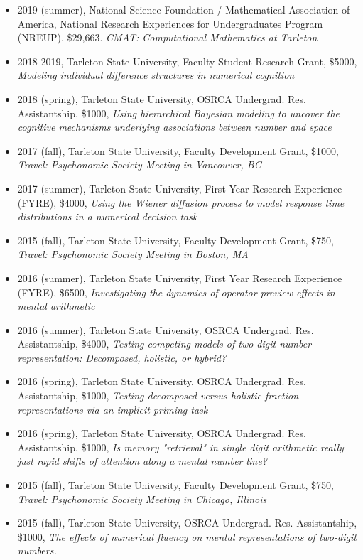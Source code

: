 \documentclass[article,10pt]{article}
\begin{document}
\begin{itemize}
\item 2019 (summer), National Science Foundation / Mathematical Association of America, National Research Experiences for Undergraduates Program (NREUP), \$29,663. \emph{CMAT: Computational Mathematics at Tarleton}
\item 2018-2019, Tarleton State University, Faculty-Student Research Grant, \$5000, \emph{Modeling individual difference structures in numerical cognition}
\item 2018 (spring), Tarleton State University, OSRCA Undergrad. Res. Assistantship, \$1000, \emph{Using hierarchical Bayesian modeling to uncover the cognitive mechanisms underlying associations between number and space}
\item 2017 (fall), Tarleton State University, Faculty Development Grant, \$1000, \emph{Travel: Psychonomic Society Meeting in Vancouver, BC}
\item 2017 (summer), Tarleton State University, First Year Research Experience (FYRE), \$4000, \emph{Using the Wiener diffusion process to model response time distributions in a numerical decision task}
\item 2015 (fall), Tarleton State University, Faculty Development Grant, \$750, \emph{Travel: Psychonomic Society Meeting in Boston, MA}
\item 2016 (summer), Tarleton State University, First Year Research Experience (FYRE), \$6500, \emph{Investigating the dynamics of operator preview effects in mental arithmetic}
\item 2016 (summer), Tarleton State University, OSRCA Undergrad. Res. Assistantship, \$4000, \emph{Testing competing models of two-digit number representation: Decomposed, holistic, or hybrid?}
\item 2016 (spring), Tarleton State University, OSRCA Undergrad. Res. Assistantship, \$1000, \emph{Testing decomposed versus holistic fraction representations via an implicit priming task}
\item 2016 (spring), Tarleton State University, OSRCA Undergrad. Res. Assistantship, \$1000, \emph{Is memory "retrieval" in single digit arithmetic really just rapid shifts of attention along a mental number line?}
\item 2015 (fall), Tarleton State University, Faculty Development Grant, \$750, \emph{Travel: Psychonomic Society Meeting in Chicago, Illinois}
\item 2015 (fall), Tarleton State University, OSRCA Undergrad. Res. Assistantship, \$1000, \emph{The effects of numerical fluency on mental representations of two-digit numbers.}

\end{itemize}
\end{document}
